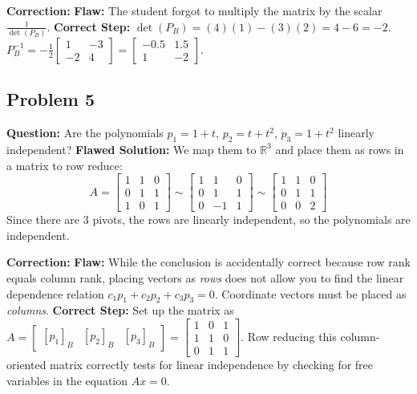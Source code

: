 \documentclass[11pt]{article}
\begin{document}
\textbf{Correction:}
\textbf{Flaw:} The student forgot to multiply the matrix by the scalar $\frac{1}{\det(P_B)}$.
\textbf{Correct Step:} $\det(P_B) = (4)(1) - (3)(2) = 4 - 6 = -2$. 
$P_B^{-1} = -\frac{1}{2} \begin{bmatrix} 1 & -3 \\ -2 & 4 \end{bmatrix} = \begin{bmatrix} -0.5 & 1.5 \\ 1 & -2 \end{bmatrix}$.

\subsection{Problem 5}
\textbf{Question:} Are the polynomials $p_1 = 1+t$, $p_2 = t+t^2$, $p_3 = 1+t^2$ linearly independent?
\textbf{Flawed Solution:}
We map them to $\mathbb{R}^3$ and place them as rows in a matrix to row reduce:
\[ A = \begin{bmatrix} 1 & 1 & 0 \\ 0 & 1 & 1 \\ 1 & 0 & 1 \end{bmatrix} \sim \begin{bmatrix} 1 & 1 & 0 \\ 0 & 1 & 1 \\ 0 & -1 & 1 \end{bmatrix} \sim \begin{bmatrix} 1 & 1 & 0 \\ 0 & 1 & 1 \\ 0 & 0 & 2 \end{bmatrix} \]
Since there are 3 pivots, the rows are linearly independent, so the polynomials are independent.

\textbf{Correction:}
\textbf{Flaw:} While the conclusion is accidentally correct because row rank equals column rank, placing vectors as \textit{rows} does not allow you to find the linear dependence relation $c_1 p_1 + c_2 p_2 + c_3 p_3 = 0$. Coordinate vectors must be placed as \textit{columns}.
\textbf{Correct Step:} Set up the matrix as $A = \begin{bmatrix} [p_1]_B & [p_2]_B & [p_3]_B \end{bmatrix} = \begin{bmatrix} 1 & 0 & 1 \\ 1 & 1 & 0 \\ 0 & 1 & 1 \end{bmatrix}$. Row reducing this column-oriented matrix correctly tests for linear independence by checking for free variables in the equation $Ax = 0$.
\end{document}
